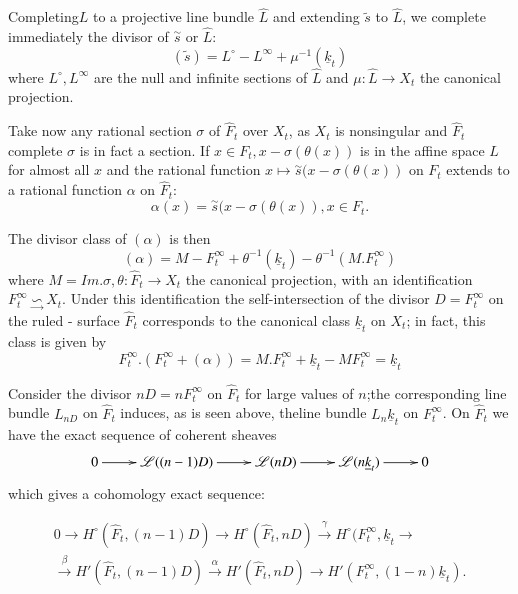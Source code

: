 Completing\pageoriginale $L$ to a projective line bundle $\hat{L}$ and extending
$\tilde{s}$ to $\hat{L}$, we complete immediately the
divisor of $ \overset{\sim}{s}$ or $ \hat{L}$: 
$$
(\tilde{s}) = L^{\circ} - L^{\infty}+ \mu^{-1}(\underline{k}_{t})
$$
where $L^{\circ}, L^{\infty}$ are the null and infinite sections of $
\hat{L}$ and $ \mu:\hat{L}\to X_{t}$ the canonical projection. 

Take now any rational section $\sigma$  of  $\hat{F}_{t}$ over
$X_{t}$, as $X_{t}$ is nonsingular and $\hat{F}_{t}$ complete
$\sigma$ is in fact a section. If $ x \in F_{t}, x- \sigma(\theta(x))$
is in the affine space $L$ for almost all $x$ and the rational function
$ x \longmapsto \overset{\sim}{s}(x -\sigma (\theta(x))$ on $ F_{t} $
extends to a rational function $\alpha$ on $ \hat{F}_{t}$: 
$$
\alpha (x) = \overset{\sim}{s}(x - \sigma(\theta (x)), x \in F_{t}.
$$

The divisor class of $(\alpha)$ is then
$$ 
(\alpha) = M - F^{\infty}_{t} + \theta^{-1}(\underline{k}_{t}) -
\theta^{-1} (M.F^{\infty}_{t}) 
$$
where $ M = Im. \sigma , \theta : \hat{F}_{t} \longrightarrow X_{t}$
the canonical projection, with an identification $ F^\infty _t
\underset{\rightarrow} \backsim X_{t}$. Under this identification the
self-intersection of the divisor $ D = F^{\infty}_{t}$ on the ruled -
surface $\hat{F}_{t}$ corresponds to the canonical class
$\underline{k}_{t}$ on $ X_{t}$; in fact, this class is given by  
$$
F^{\infty}_{t} .(F^{\infty}_{t} + (\alpha)) = M.F^{\infty}_{t} +
\underline{k}_{t} - M F^{\infty}_{t} =  \underline{k}_{t} 
 $$

Consider the divisor $ nD = nF^{\infty}_{t}$ on $
\hat{F}_{t}$ for large values of $n$;the corresponding line bundle
$ L_{nD}$ on $\hat{F}_{t}$ induces, as is seen above, the\pageoriginale line
bundle $ L{_n \underline{k}_{t}}$ on $ F^{\infty}_{t}$. On $
\hat{F}_{t}$ we have the exact sequence of coherent sheaves 
$$ 
\xymatrix{
 0 \ar[r]& \mathscr{L}((n-1)D) \ar[r] & \mathscr{L}(nD)
 \ar[r] & \mathscr{L}({n\underline{k}_{t}}) \ar[r] & 0 
}
 $$
which gives a cohomology exact sequence: 

\begin{multline*}
  0\longrightarrow H^{\circ}(\hat{F}_{t},(n-1)D) \longrightarrow
  H^{\circ}(\hat{F}_{t}, nD) \xrightarrow{\gamma}
  H^{\circ}(F^{\infty}_{t}, \underline{k}_{t}\longrightarrow\\
  \xrightarrow{\beta} H' (\hat{F}_{t},(n-1)D) \xrightarrow{\alpha}
  H' (\hat{F}_{t}, nD) \longrightarrow H' (F^{\infty}_{t},
  (1-n)\underline{k}_{t}). 
\end{multline*}

